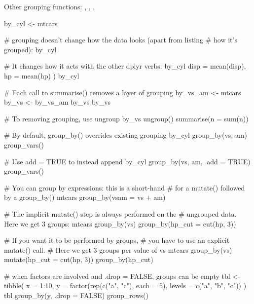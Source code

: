 \documentclass[a4paper]{book}
\begin{document}
%
\begin{SeeAlso}
Other grouping functions: 
,
,
,
\end{SeeAlso}
%
\begin{Examples}
\begin{ExampleCode}
by_cyl <- mtcars %

# grouping doesn't change how the data looks (apart from listing
# how it's grouped):
by_cyl

# It changes how it acts with the other dplyr verbs:
by_cyl %
  disp = mean(disp),
  hp = mean(hp)
)
by_cyl %

# Each call to summarise() removes a layer of grouping
by_vs_am <- mtcars %
by_vs <- by_vs_am %
by_vs
by_vs %

# To removing grouping, use ungroup
by_vs %
  ungroup() %
  summarise(n = sum(n))

# By default, group_by() overrides existing grouping
by_cyl %
  group_by(vs, am) %
  group_vars()

# Use add = TRUE to instead append
by_cyl %
  group_by(vs, am, .add = TRUE) %
  group_vars()

# You can group by expressions: this is a short-hand
# for a mutate() followed by a group_by()
mtcars %
  group_by(vsam = vs + am)

# The implicit mutate() step is always performed on the
# ungrouped data. Here we get 3 groups:
mtcars %
  group_by(vs) %
  group_by(hp_cut = cut(hp, 3))

# If you want it to be performed by groups,
# you have to use an explicit mutate() call.
# Here we get 3 groups per value of vs
mtcars %
  group_by(vs) %
  mutate(hp_cut = cut(hp, 3)) %
  group_by(hp_cut)

# when factors are involved and .drop = FALSE, groups can be empty
tbl <- tibble(
  x = 1:10,
  y = factor(rep(c("a", "c"), each  = 5), levels = c("a", "b", "c"))
)
tbl %
  group_by(y, .drop = FALSE) %
  group_rows()

\end{ExampleCode}
\end{Examples}
\end{document}
